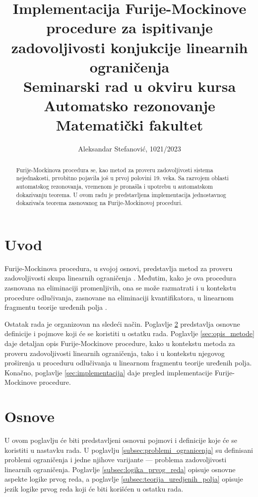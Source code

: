 \documentclass[a4paper,10pt]{article}
\title{Implementacija Furije-Mockinove procedure za ispitivanje zadovoljivosti konjukcije linearnih ograničenja\\ \small{Seminarski rad u okviru kursa\\Automatsko rezonovanje\\Matematički fakultet}}
\author{Aleksandar Stefanović, 1021/2023}
\begin{document}
\maketitle

\begin{abstract}

Furije-Mockinova procedura se, kao metod za proveru zadovoljivosti sistema nejednakosti, prvobitno pojavila još u prvoj polovini 19. veka. Sa razvojem oblasti automatskog rezonovanja, vremenom je pronašla i upotrebu u automatskom dokazivanju teorema. U ovom radu je predstavljena implementacija jednostavnog dokazivača teorema zasnovanog na Furije-Mockinovoj proceduri.

\end{abstract}

\tableofcontents

\newpage

\section{Uvod}

Furije-Mockinova procedura, u svojoj osnovi, predstavlja metod za proveru zadovoljivosti skupa linearnih ograničenja \cite{theory_of_linear_and_integer_programming}. Međutim, kako je ova procedura zasnovana na eliminaciji promenljivih, ona se može razmatrati i u kontekstu procedure odlučivanja, zasnovane na eliminaciji kvantifikatora, u linearnom fragmentu teorije uređenih polja \cite{quantifier_elimination_fourier_motzkin}.

Ostatak rada je organizovan na sledeći način. Poglavlje \ref{sec:osnove} predstavlja osnovne definicije i pojmove koji će se koristiti u ostatku rada. Poglavlje \ref{sec:opis_metode} daje detaljan opis Furije-Mockinove procedure, kako u kontekstu metoda za proveru zadovoljivosti linearnih ograničenja, tako i u kontekstu njegovog proširenja u proceduru odlučivanja u linearnom fragmentu teorije uređenih polja. Konačno, poglavlje \ref{sec:implementacija} daje pregled implementacije Furije-Mockinove procedure.

\section{Osnove}
\label{sec:osnove}

U ovom poglavlju će biti predstavljeni osnovni pojmovi i definicije koje će se koristiti u nastavku rada. U poglavlju \ref{subsec:problemi_ogranicenja} su definisani problemi ograničenja i jedne njihove varijante --- problema zadovoljivosti linearnih ograničenja. Poglavlje \ref{subsec:logika_prvog_reda} opisuje osnovne aspekte logike prvog reda, a poglavlje \ref{subsec:teorija_uredjenih_polja} opisuje jezik logike prvog reda koji će biti korišćen u ostatku rada.
\end{document}
